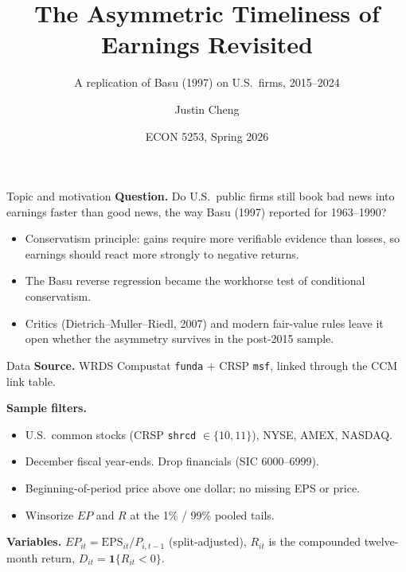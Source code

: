 \documentclass[11pt,aspectratio=169]{beamer}
\title{The Asymmetric Timeliness of Earnings Revisited}
\subtitle{A replication of Basu (1997) on U.S.\ firms, 2015--2024}
\author{Justin Cheng}
\institute{University of Oklahoma}
\date{ECON 5253, Spring 2026}
\begin{document}
\maketitle

\begin{frame}{Topic and motivation}
  \textbf{Question.} Do U.S.\ public firms still book bad news into earnings
  faster than good news, the way Basu (1997) reported for 1963--1990?
  \medskip
  \begin{itemize}
    \item Conservatism principle: gains require more verifiable evidence
          than losses, so earnings should react more strongly to negative
          returns.
    \item The Basu reverse regression became the workhorse test of
          conditional conservatism.
    \item Critics (Dietrich--Muller--Riedl, 2007) and modern fair-value
          rules leave it open whether the asymmetry survives in the
          post-2015 sample.
  \end{itemize}
\end{frame}

\begin{frame}{Data}
  \textbf{Source.} WRDS Compustat \texttt{funda} + CRSP \texttt{msf},
  linked through the CCM link table.

  \medskip
  \textbf{Sample filters.}
  \begin{itemize}
    \item U.S.\ common stocks (CRSP \texttt{shrcd} $\in \{10,11\}$),
          NYSE, AMEX, NASDAQ.
    \item December fiscal year-ends. Drop financials (SIC 6000--6999).
    \item Beginning-of-period price above one dollar; no missing EPS or
          price.
    \item Winsorize $EP$ and $R$ at the 1\% / 99\% pooled tails.
  \end{itemize}

  \medskip
  \textbf{Variables.}
  $EP_{it} = \mathrm{EPS}_{it} / P_{i,t-1}$ (split-adjusted),
  $R_{it}$ is the compounded twelve-month return,
  $D_{it} = \mathbf{1}\{R_{it} < 0\}$.
\end{frame}
\end{document}
